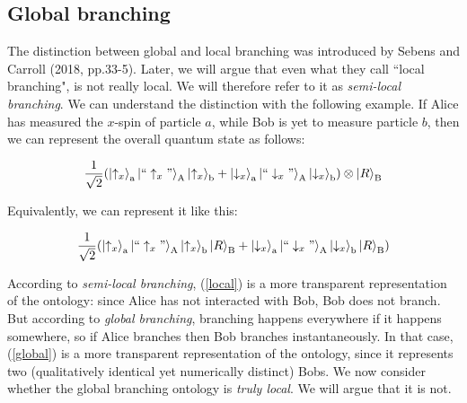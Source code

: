 \documentclass[12pt]{article}
\begin{document}
\subsection{Global branching}\label{Global branching}

The distinction between global and local branching was introduced by Sebens and Carroll (2018, pp.33-5). Later, we will argue that even what they call ``local branching", is not really local. We will therefore refer to it as \textit{semi-local branching}. We can understand the distinction with the following example. If Alice has measured the $x$-spin of particle $a$, while Bob is yet to measure particle $b$, then we can represent the overall quantum state as follows:

\begin{equation}\label{local}
\frac{1}{\sqrt 2}(\Ket{\uparrow_x}_{\rm a}\Ket{``\uparrow_x"}_{\rm A}\Ket{\uparrow_x}_{\rm b}+
\Ket{\downarrow_x}_{\rm a}\Ket{``\downarrow_x"}_{\rm A}\Ket{\downarrow_x}_{\rm b}) \otimes \Ket{R}_{\rm B}
\end{equation}

Equivalently, we can represent it like this:

\begin{equation}\label{global}
\frac{1}{\sqrt 2}(\Ket{\uparrow_x}_{\rm a}\Ket{``\uparrow_x"}_{\rm A}\Ket{\uparrow_x}_{\rm b}\Ket{R}_{\rm B}+
\Ket{\downarrow_x}_{\rm a}\Ket{``\downarrow_x"}_{\rm A}\Ket{\downarrow_x}_{\rm b}\Ket{R}_{\rm B})
\end{equation}

According to \textit{semi-local branching}, (\ref{local}) is a more transparent representation of the ontology: since Alice has not interacted with Bob, Bob does not branch. But according to \textit{global branching}, branching happens everywhere if it happens somewhere, so if Alice branches then Bob branches instantaneously. In that case, (\ref{global}) is a more transparent representation of the ontology, since it represents two (qualitatively identical yet numerically distinct) Bobs. We now consider whether the global branching ontology is \textit{truly local}. We will argue that it is not. 
\end{document}
